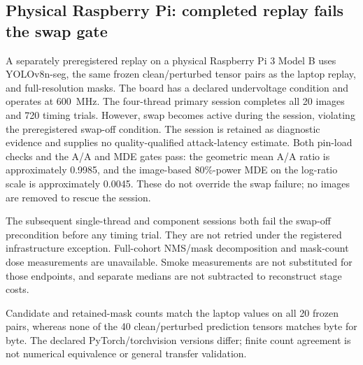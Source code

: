 \subsection{Physical Raspberry Pi: completed replay fails the swap gate}
\label{app:seg-pi3b-diagnostic}
A separately preregistered replay on a physical Raspberry Pi 3 Model B uses
YOLOv8n-seg, the same frozen clean/perturbed tensor pairs as the laptop replay,
and full-resolution masks. The board has a declared undervoltage condition
and operates at 600~MHz. The four-thread primary session completes all
20 images and 720 timing trials. However, swap becomes active during
the session, violating the preregistered swap-off condition. The session is
retained as diagnostic evidence and supplies no quality-qualified attack-latency
estimate. Both pin-load checks and the A/A and MDE gates pass: the geometric
mean A/A ratio is approximately 0.9985, and the image-based 80\%-power MDE
on the log-ratio scale is approximately 0.0045. These do not override the
swap failure; no images are removed to rescue the session.

The subsequent single-thread and component sessions both fail the swap-off
precondition before any timing trial. They are not retried under the registered
infrastructure exception. Full-cohort NMS/mask decomposition and mask-count dose
measurements are unavailable. Smoke measurements are not substituted for those
endpoints, and separate medians are not subtracted to reconstruct stage costs.

Candidate and retained-mask counts match the laptop values on all 20
frozen pairs, whereas none of the 40 clean/perturbed prediction tensors
matches byte for byte. The declared PyTorch/torchvision versions differ;
finite count agreement is not numerical equivalence or general transfer validation.
